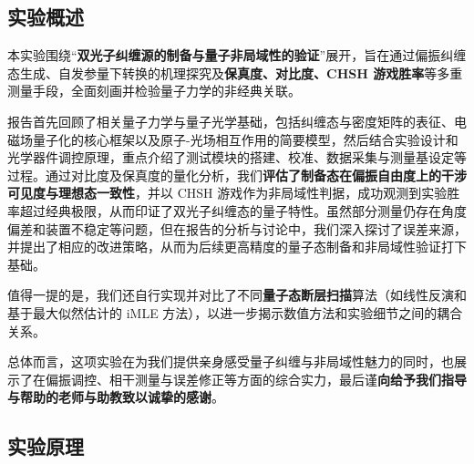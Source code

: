 
\clearpage
\setcounter{section}{0}

\subsection{实验概述}
本实验围绕“\textbf{双光子纠缠源的制备与量子非局域性的验证}”展开，旨在通过偏振纠缠态生成、自发参量下转换的机理探究及\textbf{保真度、对比度、CHSH 游戏胜率}等多重测量手段，全面刻画并检验量子力学的非经典关联。

报告首先回顾了相关量子力学与量子光学基础，包括纠缠态与密度矩阵的表征、电磁场量子化的核心框架以及原子-光场相互作用的简要模型，然后结合实验设计和光学器件调控原理，重点介绍了测试模块的搭建、校准、数据采集与测量基设定等过程。通过对比度及保真度的量化分析，我们\textbf{评估了制备态在偏振自由度上的干涉可见度与理想态一致性}，并以 CHSH 游戏作为非局域性判据，成功观测到实验胜率超过经典极限，从而印证了双光子纠缠态的量子特性。虽然部分测量仍存在角度偏差和装置不稳定等问题，但在报告的分析与讨论中，我们深入探讨了误差来源，并提出了相应的改进策略，从而为后续更高精度的量子态制备和非局域性验证打下基础。

值得一提的是，我们还自行实现并对比了不同\textbf{量子态断层扫描}算法（如线性反演和基于最大似然估计的 iMLE 方法），以进一步揭示数值方法和实验细节之间的耦合关系。

总体而言，这项实验在为我们提供亲身感受量子纠缠与非局域性魅力的同时，也展示了在偏振调控、相干测量与误差修正等方面的综合实力，最后谨\textbf{向给予我们指导与帮助的老师与助教致以诚挚的感谢}。

\subsection{实验原理}


